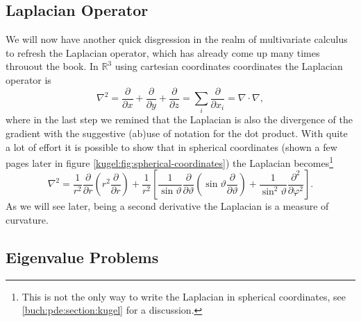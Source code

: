 \subsection{Laplacian Operator}
\label{kugel:sec:preliminaries:laplacian}

We will now have another quick disgression in the realm of multivariate
calculus to refresh the Laplacian operator, which has already come up many
times throuout the book. In $\mathbb{R}^3$ using cartesian coordinates
coordinates the Laplacian operator is
\begin{equation*}
  \nabla^2 = \frac{\partial}{\partial x}
    + \frac{\partial}{\partial y}
    + \frac{\partial}{\partial z}
    = \sum_i \frac{\partial}{\partial x_i}
    = \nabla \cdot \nabla,
\end{equation*}
where in the last step we remined that the Laplacian is also the divergence of
the gradient with the suggestive (ab)use of notation for the dot product. With
quite a lot of effort it is possible to show that in spherical coordinates
(shown a few pages later in figure \ref{kugel:fig:spherical-coordinates}) the
Laplacian becomes\footnote{This is not the only way to write the Laplacian in
spherical coordinates, see \ref{buch:pde:section:kugel} for a discussion.}
\begin{equation*}
    \nabla^2 =
      \frac{1}{r^2} \frac{\partial}{\partial r} \left(
        r^2 \frac{\partial}{\partial r}
      \right)
      + \frac{1}{r^2} \left[
          \frac{1}{\sin\vartheta} \frac{\partial}{\partial \vartheta} \left(
            \sin\vartheta \frac{\partial}{\partial\vartheta}
          \right)
        + \frac{1}{\sin^2 \vartheta} \frac{\partial^2}{\partial\varphi^2}
      \right].
\end{equation*}
As we will see later, being a second derivative the Laplacian is a measure of
curvature.

\subsection{Eigenvalue Problems}

